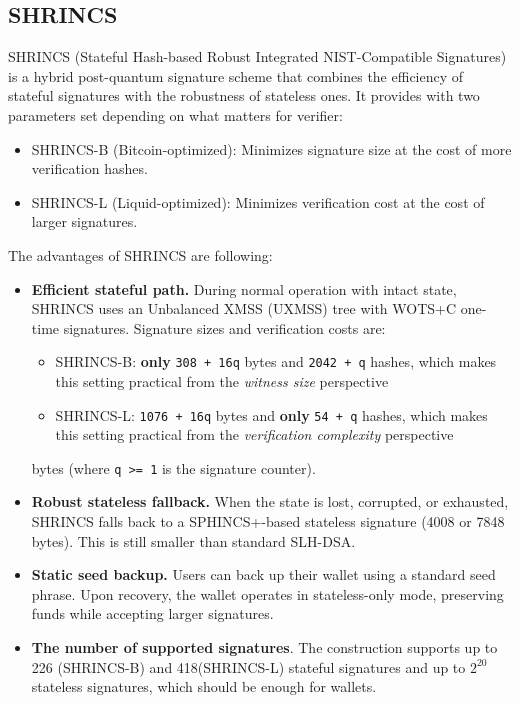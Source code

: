 \subsection{SHRINCS} 
SHRINCS (Stateful Hash-based Robust Integrated NIST-Compatible Signatures) is a hybrid post-quantum signature scheme that combines the efficiency of stateful signatures with the robustness of stateless ones. It provides with two parameters set depending on what matters for verifier:
    \begin{itemize}
        \item SHRINCS-B (Bitcoin-optimized): Minimizes signature size at the cost of more verification hashes.
        \item SHRINCS-L (Liquid-optimized): Minimizes verification cost at the cost of larger signatures.
    \end{itemize}
The advantages of SHRINCS are following: 
\begin{itemize}
    \item \textbf{Efficient stateful path.} During normal operation with intact state, SHRINCS uses an Unbalanced XMSS (UXMSS) tree with WOTS+C one-time signatures. Signature sizes and verification costs are:
    \begin{itemize}
        \item SHRINCS-B: \textbf{only} \texttt{308 + 16q} bytes and \texttt{2042 + q} hashes, which makes this setting practical from the \textit{witness size} perspective
        \item SHRINCS-L: \texttt{1076 + 16q} bytes and \textbf{only} \texttt{54 + q} hashes, which makes this setting practical from the \textit{verification complexity} perspective
    \end{itemize} 
    bytes (where \texttt{q >= 1} is the signature counter).
    \item \textbf{Robust stateless fallback.} When the state is lost, corrupted, or exhausted, SHRINCS falls back to a SPHINCS+-based stateless signature (4008 or 7848 bytes). This is still smaller than standard SLH-DSA.
    \item \textbf{Static seed backup.} Users can back up their wallet using a standard seed phrase. Upon recovery, the wallet operates in stateless-only mode, preserving funds while accepting larger signatures.
    \item \textbf{The number of supported signatures}. The construction supports up to 226 (SHRINCS-B) and 418(SHRINCS-L) stateful signatures and up to $2^{20}$ stateless signatures, which should be enough for wallets. 
\end{itemize}

